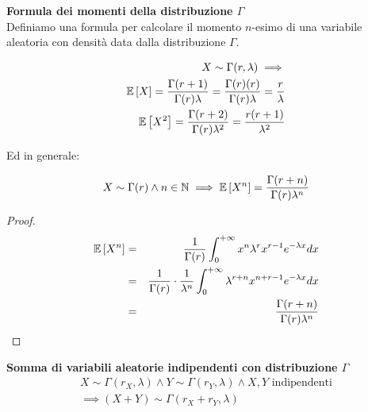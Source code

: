 \begin{defn}
    \textbf{Formula dei momenti della distribuzione $\Gamma$} \\
    Definiamo una formula per calcolare il momento $n$-esimo di una variabile
    aleatoria con densità data dalla distribuzione $\Gamma$.

    \begin{equation*}
        \begin{aligned}
        X \sim \Gamma(r, \lambda) \implies \\
        \mathbb{E}\left[X\right] = \frac{\Gamma(r + 1)}{\Gamma(r) \lambda} = \frac{\Gamma(r) (r)}{\Gamma(r) \lambda} = \frac{r}{\lambda} \\
        \mathbb{E}\left[X^2\right] = \frac{\Gamma(r + 2)}{\Gamma(r) \lambda^2} = \frac{r(r+1)}{\lambda^2}
        \end{aligned}
    \end{equation*}

    Ed in generale:

    \begin{equation*}
        \begin{aligned}
           X \sim \Gamma(r) \land n \in \mathbb{N} \implies \mathbb{E}\left[X^n\right] = \frac{\Gamma(r + n)}{\Gamma(r) \lambda^n}
        \end{aligned}
    \end{equation*}

    \begin{proof}
        \begin{eqnarray*}
            \mathbb{E}\left[X^n\right] &=& \frac{1}{\Gamma(r)} \int_{0}^{+\infty} x^n \lambda^r x^{r-1} e^{-\lambda x} dx  \\
            &=& \frac{1}{\Gamma(r)} \cdot \frac{1}{\lambda^n} \int_{0}^{+\infty} \lambda^{r+n} x^{n + r -1} e^{-\lambda x} dx \\
            &=& \frac{\Gamma(r + n)}{\Gamma(r) \lambda^n}
        \end{eqnarray*}
    \end{proof}

\end{defn}

\begin{defn}
    \textbf{Somma di variabili aleatorie indipendenti con distribuzione $\Gamma$} \\

    \begin{equation*}
        \begin{aligned}
            X \sim \Gamma(r_X, \lambda) \land Y \sim \Gamma(r_Y, \lambda) \land X,Y \text{  indipendenti} \\
            \implies (X + Y) \sim \Gamma(r_X + r_Y, \lambda)
        \end{aligned}
    \end{equation*}

\end{defn}



